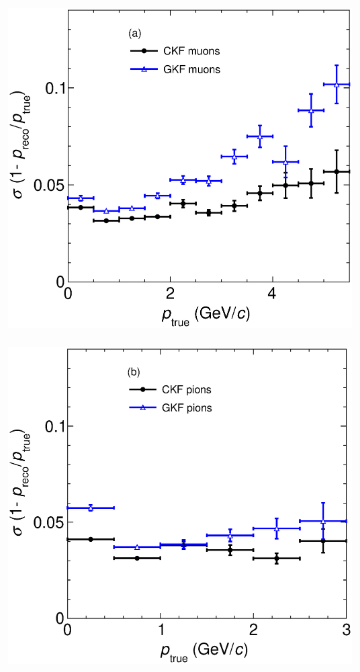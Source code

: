 \begin{figure}[t]
     \centering
     \begin{subfigure}{0.32\textwidth}
         \centering
         \includegraphics[width=\textwidth]{figures/ch5-KF_NDGAr/FullSample/Int/pRes/2D/RespVSp_13.eps}
         \caption{}
         \label{fig:pResVSp13_Int}
     \end{subfigure}
     \begin{subfigure}{0.32\textwidth}
         \centering
         \includegraphics[width=\textwidth]{figures/ch5-KF_NDGAr/FullSample/Int/pRes/2D/RespVSp_211.eps}

\end{subfigure}
\end{figure}
